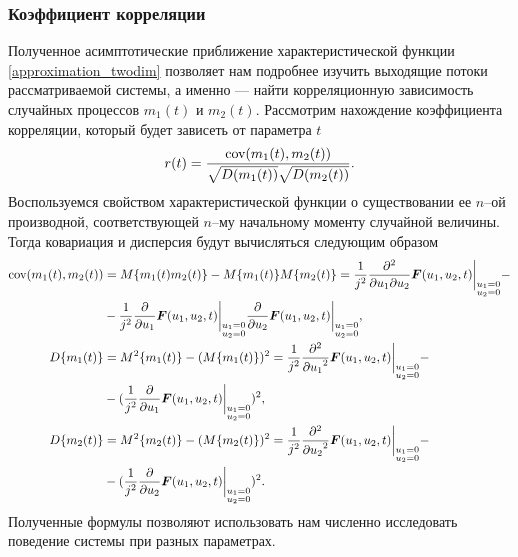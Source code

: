 \subsubsection{Коэффициент корреляции} \label{corr_section}
Полученное асимптотические приближение характеристической функции \eqref{approximation_twodim} позволяет нам подробнее изучить выходящие потоки рассматриваемой системы, а именно --- найти корреляционную зависимость случайных процессов $m_{1}(t)$ и $m_{2}(t)$.
Рассмотрим нахождение коэффициента корреляции, который будет зависеть от параметра $t$
\begin{equation*}
	r(t) = \frac{\textnormal{cov}(m_{1}(t),m_{2}(t))}{\sqrt{D(m_{1}(t))}\sqrt{D(m_{2}(t))}}.
\end{equation*}
Воспользуемся свойством характеристической функции о существовании ее $n$--ой производной, соответствующей $n$--му начальному моменту случайной величины. Тогда ковариация и дисперсия будут вычисляться следующим образом
\begin{equation*}
	\begin{split}
		\textnormal{cov}(m_{1}(t),m_{2}(t)) &= M\{m_{1}(t)m_{2}(t)\} - M\{m_{1}(t)\}M\{m_{2}(t)\} = \frac{1}{j^{2}}\frac{{\partial}^{2}}{{\partial u_{1}}{\partial u_{2}}}\boldsymbol{F}(u_{1},u_{2},t) \bigg\rvert_{\substack{u_{1} = 0 \\ u_{2} = 0}} - \\ &- \frac{1}{j^{2}} \frac{{\partial}}{{\partial u_{1}}} \boldsymbol{F}(u_{1},u_{2},t) \bigg\rvert_{\substack{u_{1} = 0 \\ u_{2} = 0}} \frac{{\partial}}{{\partial u_{2}}} \boldsymbol{F}(u_{1},u_{2},t) \bigg\rvert_{\substack{u_{1} = 0 \\ u_{2} = 0}},
		\\
		D\{m_{1}(t)\} &= M^{2}\{m_{1}(t)\} - (M\{m_{1}(t)\})^{2} = \frac{1}{j^{2}}\frac{{\partial}^{2}}{{\partial u_{1}}^{2}}\boldsymbol{F}(u_{1},u_{2},t) \bigg\rvert_{\substack{u_{1} = 0 \\ u_{2} = 0}}  - \\ &- (\frac{1}{j^{2}} \frac{{\partial}}{{\partial u_{1}}} \boldsymbol{F}(u_{1},u_{2},t) \bigg\rvert_{\substack{u_{1} = 0 \\ u_{2} = 0}})^{2},
		\\
		D\{m_{2}(t)\} &= M^{2}\{m_{2}(t)\} - (M\{m_{2}(t)\})^{2} = \frac{1}{j^{2}}\frac{{\partial}^{2}}{{\partial u_{2}}^{2}}\boldsymbol{F}(u_{1},u_{2},t) \bigg\rvert_{\substack{u_{1} = 0 \\ u_{2} = 0}}  - \\ &- (\frac{1}{j^{2}} \frac{{\partial}}{{\partial u_{2}}} \boldsymbol{F}(u_{1},u_{2},t) \bigg\rvert_{\substack{u_{1} = 0 \\ u_{2} = 0}})^{2}.
	\end{split}
\end{equation*}
Полученные формулы позволяют использовать нам численно исследовать поведение системы при разных параметрах.
\clearpage